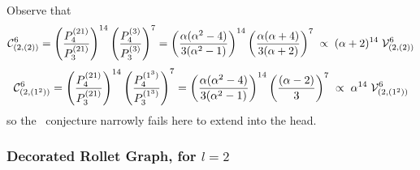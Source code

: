 \documentclass{article}
\newcommand{\ppmm}[1]{#1}  %
\newcommand{\bajm}[1]{\textcolor{blue}{#1}}
\theoremstyle{definition}
\newcommand{\xx}{\alpha}       %
\numberwithin{equation}{subsection}
\begin{document}
Observe that
\[
\CC^{6}_{(2,(2))} = 
\left( \frac{ P^{(21)}_{\ppmm{4}}}{P^{(21)}_{3}} \right)^{14} 
\left( \frac{ P^{(3)}_{\ppmm{4}}}{P^{(3)}_{3}} \right)^{7} 
=  \left( \frac{\xx(\xx^2 -4)}{3(\xx^2 -1)}  \right)^{14} 
\left( \frac{\xx (\xx+4)}{3(\xx+2)}  \right)^{7} 
\;\propto \; (\xx+2)^{14} \; \V^6_{(2,(2))}
\]
\[
\CC^{6}_{(2,(1^2))} =
\left( \frac{ P^{(21)}_{\ppmm{4}}}{P^{(21)}_{3}} \right)^{14} 
\left( \frac{ P^{(1^3)}_{\ppmm{4}}}{P^{(1^3)}_{3}} \right)^{7} 
=  \left( \frac{\xx(\xx^2 -4)}{3(\xx^2 -1)}  \right)^{14} 
\left( \frac{ (\xx-2)}{3}  \right)^{7} 
\;\propto  \; \xx^{14} \; \V^6_{(2,(1^2))}
\]
so the \ournotmain\ conjecture narrowly fails here to extend into the head.



\subsubsection{Decorated Rollet Graph, for $l=2$}   \label{ss:gdetl2}
\end{document}
